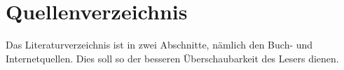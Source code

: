 \documentclass[a4paper]{scrartcl}
\begin{document}





\thispagestyle{empty}
\setcounter{page}{0}

\newpage


\newpage
%

\newpage

\newpage

\newpage

\newpage

\newpage

\newpage

\newpage
 
\newpage

\newpage
\section*{Quellenverzeichnis}
Das Literaturverzeichnis ist in zwei Abschnitte, nämlich den Buch- und Internetquellen. Dies soll so der besseren Überschaubarkeit des Lesers dienen.
\thispagestyle{empty}
\thispagestyle{empty}
\thispagestyle{empty}

%


\end{document}
